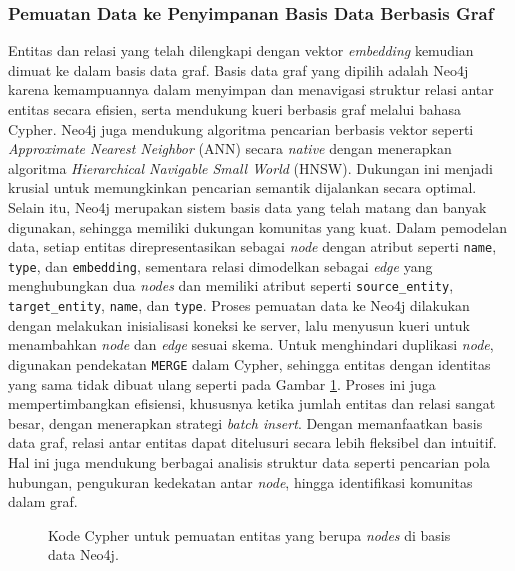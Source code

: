 \subsubsection{Pemuatan Data ke Penyimpanan Basis Data Berbasis Graf}
Entitas dan relasi yang telah dilengkapi dengan vektor \textit{embedding} kemudian dimuat ke dalam basis data graf.
Basis data graf yang dipilih adalah Neo4j karena kemampuannya dalam menyimpan dan menavigasi struktur relasi antar entitas secara efisien, serta mendukung kueri berbasis graf melalui bahasa Cypher.
Neo4j juga mendukung algoritma pencarian berbasis vektor seperti \textit{Approximate Nearest Neighbor} (ANN) secara \textit{native} dengan menerapkan algoritma \textit{Hierarchical Navigable Small World} (HNSW).
Dukungan ini menjadi krusial untuk memungkinkan pencarian semantik dijalankan secara optimal.
Selain itu, Neo4j merupakan sistem basis data yang telah matang dan banyak digunakan, sehingga memiliki dukungan komunitas yang kuat. Dalam pemodelan data, setiap entitas direpresentasikan sebagai \textit{node} dengan atribut seperti \texttt{name}, \texttt{type}, dan \texttt{embedding}, sementara relasi dimodelkan sebagai \textit{edge} yang menghubungkan dua \textit{nodes} dan memiliki atribut seperti \texttt{source\_entity}, \texttt{target\_entity}, \texttt{name}, dan \texttt{type}.
Proses pemuatan data ke Neo4j dilakukan dengan melakukan inisialisasi koneksi ke server, lalu menyusun kueri untuk menambahkan \textit{node} dan \textit{edge} sesuai skema.
Untuk menghindari duplikasi \textit{node}, digunakan pendekatan \texttt{MERGE} dalam Cypher, sehingga entitas dengan identitas yang sama tidak dibuat ulang seperti pada Gambar \ref{fig:cypher-insert-entities}.
Proses ini juga mempertimbangkan efisiensi, khususnya ketika jumlah entitas dan relasi sangat besar, dengan menerapkan strategi \textit{batch insert}.
Dengan memanfaatkan basis data graf, relasi antar entitas dapat ditelusuri secara lebih fleksibel dan intuitif.
Hal ini juga mendukung berbagai analisis struktur data seperti pencarian pola hubungan, pengukuran kedekatan antar \textit{node}, hingga identifikasi komunitas dalam graf.

\begin{figure}[H]
	\centering
	\caption{
		Kode Cypher untuk pemuatan entitas yang berupa \textit{nodes} di basis data Neo4j.
	}
	\label{fig:cypher-insert-entities}
\end{figure}


